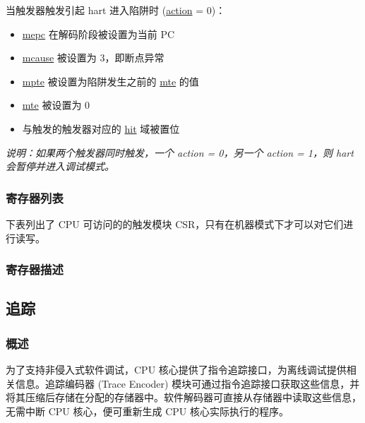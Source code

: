\documentclass[main\_\_CN.tex]{subfiles}
\begin{document}
当触发器触发引起 hart 进入陷阱时 (\hyperref[fielddesc:MCONTROLACTION]{action} = 0)：
\begin{itemize}
    \item \hyperref[regdesc:MEPC]{mepc} 在解码阶段被设置为当前 PC
    \item \hyperref[regdesc:MCAUSE]{mcause} 被设置为 3，即断点异常
    \item \hyperref[fielddesc:TCONTROLMPTE]{mpte} 被设置为陷阱发生之前的 \hyperref[fielddesc:TCONTROLMTE]{mte} 的值
    \item \hyperref[fielddesc:TCONTROLMTE]{mte} 被设置为 0
    \item 与触发的触发器对应的 \hyperref[fielddesc:MCONTROLHIT]{hit} 域被置位
\end{itemize}

\textit{说明：如果两个触发器同时触发，一个 action = 0，另一个 action = 1，则 hart 会暂停并进入调试模式。}


\hypertarget{riscvcpu-hwt-reg-summ}{}
\subsubsection{寄存器列表}
\label{sec:riscvcpu-hwt-reg-summ}


下表列出了 CPU 可访问的的触发模块 CSR，只有在机器模式下才可以对它们进行读写。




\subsubsection{寄存器描述}




\newpage
\subsection{追踪}
\label{sec:riscvcpu-trace}

\subsubsection{概述}
\label{sec:riscvcpu-trace-overview}
为了支持非侵入式软件调试，CPU 核心提供了指令追踪接口，为离线调试提供相关信息。追踪编码器 (Trace Encoder) 模块可通过指令追踪接口获取这些信息，并将其压缩后存储在分配的存储器中。软件解码器可直接从存储器中读取这些信息，无需中断 CPU 核心，便可重新生成 CPU 核心实际执行的程序。
\end{document}
